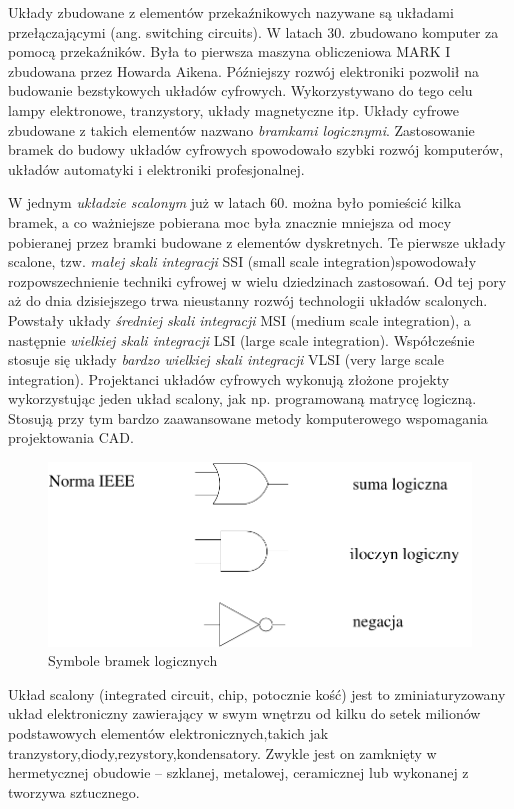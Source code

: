 \documentclass[a4paper,11pt]{article}
\begin{document}
Układy zbudowane z elementów przekaźnikowych nazywane są układami przełączającymi (ang. switching circuits). W latach 30. zbudowano komputer za pomocą przekaźników. Była to pierwsza maszyna obliczeniowa MARK I zbudowana przez Howarda Aikena. Późniejszy rozwój elektroniki pozwolił na budowanie bezstykowych układów cyfrowych. Wykorzystywano do tego celu lampy elektronowe, tranzystory, układy magnetyczne itp. Układy cyfrowe zbudowane z takich elementów nazwano \textit{bramkami logicznymi}. Zastosowanie bramek do budowy układów cyfrowych spowodowało szybki rozwój komputerów, układów automatyki i elektroniki profesjonalnej.\par
W jednym \textit{układzie scalonym} już w latach 60. można było pomieścić kilka bramek, a co ważniejsze pobierana moc była znacznie mniejsza od mocy pobieranej przez bramki budowane z elementów dyskretnych. Te pierwsze układy scalone, tzw. \textit{małej skali integracji} SSI (small scale integration)spowodowały rozpowszechnienie techniki cyfrowej w wielu dziedzinach zastosowań. Od tej pory aż do dnia dzisiejszego trwa nieustanny rozwój technologii układów scalonych. Powstały układy \textit{średniej skali integracji} MSI (medium scale integration), a następnie \textit{wielkiej skali integracji} LSI (large scale integration). Współcześnie stosuje się układy \textit{bardzo wielkiej skali integracji} VLSI (very large scale integration). Projektanci układów cyfrowych wykonują złożone projekty wykorzystując jeden układ scalony, jak np. programowaną matrycę logiczną. Stosują przy tym bardzo zaawansowane metody komputerowego wspomagania projektowania CAD.\par \newpage

\begin{figure}[!htb]
\centerline{\includegraphics[scale=0.6]{symbole-bramek.pdf}}
\caption{Symbole bramek logicznych}
\label{fig:symLogicznych}
\end{figure}

Układ scalony (integrated circuit, chip, potocznie kość) jest to zminiaturyzowany układ elektroniczny zawierający w swym wnętrzu od kilku do setek milionów podstawowych elementów elektronicznych,takich jak tranzystory,diody,rezystory,kondensatory. Zwykle jest on zamknięty w hermetycznej obudowie – szklanej, metalowej, ceramicznej lub wykonanej z tworzywa sztucznego.\par
\end{document}
